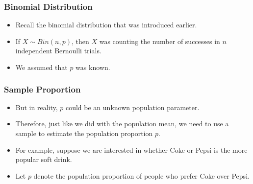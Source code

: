 \documentclass[14pt]{beamer}
\begin{document}
\begin{frame}
	\frametitle{Binomial Distribution}
	
	\begin{itemize}[label={\color{blue}$\blacktriangleright$}]
		\item Recall the binomial distribution that was introduced earlier.
		\item If $X\sim Bin(n,p)$, then $X$ was counting the number of successes in $n$ independent Bernoulli trials.
		\item We assumed that $p$ was known.
	\end{itemize}
	
\end{frame}
\begin{frame}
	\frametitle{Sample Proportion}
	
	\begin{itemize}[label={\color{blue}$\blacktriangleright$}]
\item But in reality, $p$ could be an unknown population parameter.
\item Therefore, just like we did with the population mean, we need to use a sample to estimate the population proportion $p$.
\item For example, suppose we are interested in whether Coke or Pepsi is the more popular soft drink.
\item Let $p$ denote the population proportion of people who prefer Coke over Pepsi.
	\end{itemize}
\end{frame}
\end{document}
